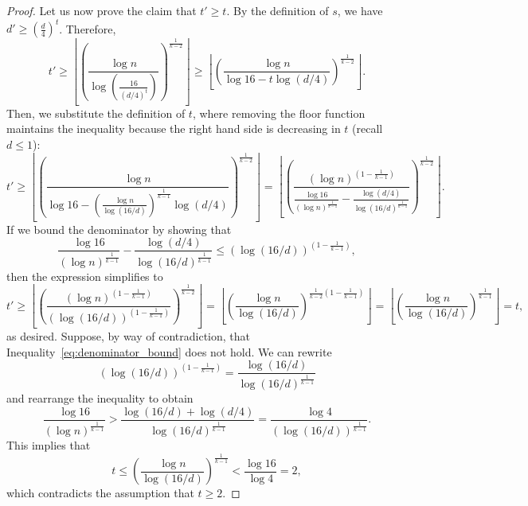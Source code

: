 \documentclass[12pt]{article}
\begin{document}
\begin{theorem}
\begin{proof}
        Let us now prove the claim that $t' \geq t$.
        By the definition of $s$, we have $d' \geq \left( \frac{d}{4} \right)^t$.
        Therefore,
        \[
            t' \geq
            \left\lfloor \left(  \frac{\log n}{\log \left(\frac{16}{(d/4)^t}\right)} \right)^
            {\frac{1}{k-2}} \right\rfloor \geq
            \left\lfloor \left(  \frac{\log n}{\log 16 - t \log (d/4)} \right)^
            {\frac{1}{k-2}} \right\rfloor.
        \]
        Then, we substitute the definition of $t$, where removing the floor function
        maintains the inequality because the right hand side is decreasing in $t$ (recall $d \leq 1$):
        \begin{equation*} \label{eq:t_prime}
            t' \geq
            \left\lfloor \left(  \frac{\log n}
            {\log 16 - \left(  \frac{\log n}{\log (16/d)} \right)^{\frac{1}{k-1}}  \log (d/4)} \right)^
            {\frac{1}{k-2}} \right\rfloor
            =
            \left\lfloor \left(  \frac{(\log n)^{\left(1-\frac{1}{k-1}\right)}}
            {\frac{\log 16}{(\log n)^{\frac{1}{k-1}}} - \frac{\log (d/4)}{\log (16/d)^{\frac{1}{k-1}}} }
            \right)^{\frac{1}{k-2}} \right\rfloor.
        \end{equation*}
        If we bound the denominator by showing that
        \begin{equation} \label{eq:denominator_bound}
            \frac{\log 16}{(\log n)^{\frac{1}{k-1}}} - \frac{\log (d/4)}{\log (16/d)^{\frac{1}{k-1}}}
            \leq \left( \log (16/d) \right)^{\left( 1 - \frac{1}{k-1} \right)},
        \end{equation}
        then the expression simplifies to
        \[
            t'
            \geq \left\lfloor \left(  \frac{(\log n)^{\left(1-\frac{1}{k-1}\right)}}
            {\left( \log (16/d) \right)^{\left( 1 - \frac{1}{k-1} \right)}}
            \right)^{\frac{1}{k-2}} \right\rfloor
            = \left\lfloor \left(  \frac{\log n}
            {\log (16/d)}
            \right)^{\frac{1}{k-2}\left( 1 - \frac{1}{k-1} \right)} \right\rfloor
            = \left\lfloor \left(  \frac{\log n}{\log (16/d)} \right)^{\frac{1}{k-1}} \right\rfloor
            = t,
        \]
        as desired.
        Suppose, by way of contradiction, that Inequality~\eqref{eq:denominator_bound} does not hold.
        We can rewrite
        \[
            (\log (16/d))^{\left( 1 - \frac{1}{k-1} \right)}
            = \frac{\log (16/d)}{\log (16/d)^{\frac{1}{k-1}}}
        \]
        and rearrange the inequality to obtain
        \[
            \frac{\log 16}{(\log n)^{\frac{1}{k-1}}}
            > \frac{\log (16/d) + \log (d/4)}{\log (16/d)^{\frac{1}{k-1}}}
            = \frac{\log 4}{(\log (16/d))^{\frac{1}{k-1}}}.
        \]
        This implies that
        \[
            t
            \leq \left( \frac{\log n}{\log (16/d)} \right)^{\frac{1}{k-1}}
            < \frac{\log 16}{\log 4} = 2,
        \]
        which contradicts the assumption that $t \geq 2$.
    \end{proof}
\end{theorem}
\end{document}
